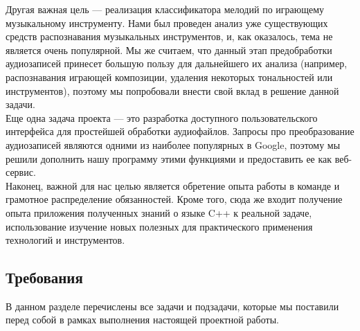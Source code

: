 \documentclass[14pt,a4paper]{article}
\begin{document}
Другая важная цель --- реализация классификатора мелодий по играющему музыкальному инструменту. Нами был проведен анализ уже существующих средств распознавания музыкальных инструментов, и, как оказалось, тема не является очень популярной. Мы же считаем, что данный этап предобработки аудиозаписей принесет большую пользу для дальнейшего их анализа (например, распознавания играющей композиции, удаления некоторых тональностей или инструментов), поэтому мы попробовали внести свой вклад в решение данной задачи. \\

Еще одна задача проекта --- это разработка доступного пользовательского интерфейса для простейшей обработки аудиофайлов. Запросы про преобразование аудиозаписей являются одними из наиболее популярных в Google, поэтому мы решили дополнить нашу программу этими функциями и предоставить ее как веб-сервис. \\

Наконец, важной для нас целью является обретение опыта работы в команде и грамотное распределение обязанностей. Кроме того, сюда же входит получение опыта приложения полученных знаний о языке C++ к реальной задаче, использование изучение новых полезных для практического применения технологий и инструментов.

\subsection{Требования}

В данном разделе перечислены все задачи и подзадачи, которые мы поставили перед собой в рамках выполнения настоящей проектной работы.
\end{document}

